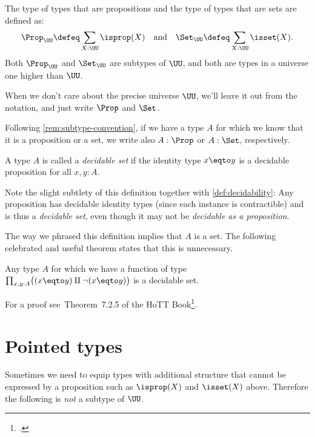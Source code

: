 \begin{definition}\label{def:Prop-Set}
The type of types that are propositions and the
type of types that are sets are defined as:
\[\Prop_\UU\defeq \sum_{X:\UU}\isprop(X)\quad
\text{and}\quad\Set_\UU\defeq \sum_{X:\UU}\isset(X).\]
Both $\Prop_\UU$ and $\Set_\UU$ are subtypes of $\UU$, and
both are types in a universe one higher than $\UU$.
\end{definition}
When we don't care about the precise universe $\UU$,
we'll leave it out from the notation,
and just write $\Prop$ and $\Set$.

Following \cref{rem:subtype-convention},
if we have a type $A$ for which we know that it is a proposition or a set,
we write also $A : \Prop$ or $A : \Set$, respectively.

\begin{definition}\label{def:decidable-set}
  A type $A$ is called a \emph{decidable set} if the identity type $x \eqto y$
  is a decidable proposition for all $x,y:A$.
\end{definition}
Note the slight subtlety of this definition together with
\cref{def:decidability}: Any proposition has decidable identity types
(since each instance is contractible) and is thus a \emph{decidable set},
even though it may not be \emph{decidable as a proposition}.

The way we phrased this definition implies that $A$ is a set.
The following celebrated and useful theorem states that this is unnecessary.
\begin{theorem}[Hedberg]\label{thm:hedberg}
  Any type $A$ for which we have a function of type
  $\prod_{x,y:A}\bigl((x \eqto y) \amalg \lnot(x \eqto y)\bigr)$
  is a decidable set.
\end{theorem}
For a proof see~Theorem~7.2.5 of the HoTT Book\footcite{hottbook}.

\section{Pointed types}\label{sec:pointedtypes}
Sometimes we need to equip types with additional structure
that cannot be expressed by a proposition such as
$\isprop(X)$ and $\isset(X)$ above.
Therefore the following is \emph{not} a subtype of $\UU$.

